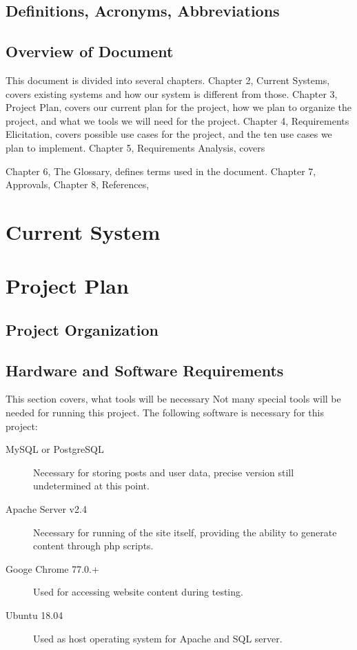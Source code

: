 \documentclass[letter,12pt]{report}
\begin{document}
\section{Definitions, Acronyms, Abbreviations}




\section{Overview of Document}
This document is divided into several chapters.
Chapter 2, Current Systems, covers existing systems and how our system
is different from those.
Chapter 3, Project Plan, covers our current plan for the project,
how we plan to organize the project, and what we tools we will need for the project.
Chapter 4, Requirements Elicitation, covers possible use cases for the project,
and the ten use cases we plan to implement.
Chapter 5, Requirements Analysis, covers

Chapter 6, The Glossary, defines terms used in the document.
Chapter 7, Approvals,
Chapter 8, References,


\chapter{Current System}



\chapter{Project Plan}

\section{Project Organization}

\section{Hardware and Software Requirements}

This section covers, what tools will be necessary
Not many special tools will be needed for running this project.
The following software is necessary for this project:
\begin{description}
\item [MySQL or PostgreSQL] Necessary for storing posts and user data,
precise version still undetermined at this point.
\item [Apache Server v2.4] Necessary for running of the site itself,
providing the ability to generate content through php scripts.
\item [Googe Chrome 77.0.+] Used for accessing website content during testing.
\item [Ubuntu 18.04] Used as host operating system for Apache and SQL server.
\end{description}
\end{document}
